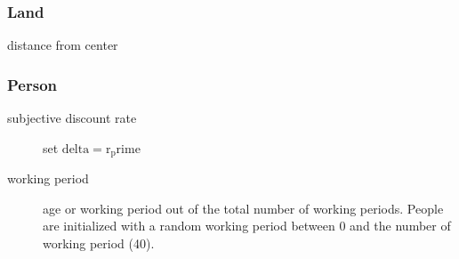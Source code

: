 \subsubsection{Land}
\begin{description}
\item[distance from center] 
\end{description}

\subsubsection{Person}
\begin{description}
\item[subjective discount rate] set $\mathrm{delta} = \mathrm{r_prime}$
\item[working period] age or working period out of the total number of working periods. People are initialized with a random working period between 0 and the number of working period (40).
\end{description}

